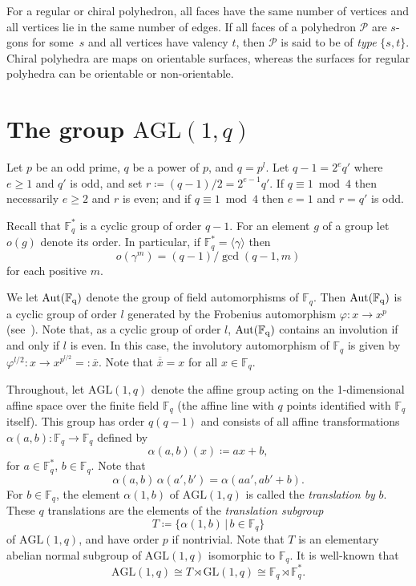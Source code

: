 \documentclass[12pt]{article}
\theoremstyle{definition}\newtheorem{definition}{Definition}[section]
\begin{document}
For a regular or chiral polyhedron, all faces have the same number of vertices and all vertices lie in the same number of edges. If all faces of a polyhedron $\mathcal{P}$ are $s$-gons for some~$s$ and all vertices have valency $t$, then $\mathcal{P}$ is said to be of {\em type\/} $\{s,t\}$. Chiral polyhedra are maps on orientable surfaces, whereas the surfaces for regular polyhedra can be orientable or non-orientable.
\smallskip

\section{The group \texorpdfstring{$\mathrm{AGL}(1,q)$}{AGL(1, q)}}
\label{groupagl}

Let $p$ be an odd prime, $q$ be a power of $p$, and $q=p^l$. Let $q-1=2^{e}q'$ where $e\geq 1$ and $q'$ is odd, and set $r\coloneqq (q-1)/2=2^{e-1}q'$. If $q\equiv 1 \bmod 4$ then necessarily $e\geq 2$ and $r$ is even; and if $q\equiv 1 \bmod 4$ then $e=1$ and $r=q'$ is odd. 

Recall that $\mathbb{F}_q^*$ is a cyclic group of order $q-1$. For an element $g$ of a group let $o(g)$ denote its order. In particular, if $\mathbb{F}_q^*=\langle\gamma\rangle$ then 
\[o(\gamma^m)=(q-1)/\gcd(q-1,m)\] 
for each positive $m$.

We let $\rm{Aut}(\mathbb{F}_q)$ denote the group of field automorphisms of $\mathbb{F}_q$. Then $\rm{Aut}(\mathbb{F}_q)$ is a cyclic group of order $l$ generated by the Frobenius automorphism $\varphi: x\rightarrow x^p$ (see~\cite{Lang1993}). Note that, as a cyclic group of order $l$, $\rm{Aut}(\mathbb{F}_q)$ contains an involution if and only if $l$ is even. In this case, the involutory automorphism of $\mathbb{F}_q$ is given by $\varphi^{l/2}: x\rightarrow x^{p^{l/2}}\!\!=:\overline{x}$. Note that $\overline{\overline{x}}=x$ for all $x\in\mathbb{F}_q$. 

Throughout, let $\mathrm{AGL}(1,q)$ denote the affine group acting on the 1-dimensional affine space over the finite field $\mathbb{F}_q$ (the affine line with $q$ points identified with $\mathbb{F}_q$ itself). This group has order $q(q-1)$ and consists of all affine transformations $\alpha(a,b): \mathbb{F}_q \rightarrow \mathbb{F}_q$ defined by
\[ \alpha(a,b)(x) \coloneqq  ax+b,\]
for $a\in\mathbb{F}_q^*$, $b\in\mathbb{F}_q$. Note that 
\[ \alpha(a,b)\, \alpha(a',b') = \alpha(aa',ab'+b).\]
For $b\in\mathbb{F}_q$, the element $\alpha(1,b)$ of $\mathrm{AGL}(1,q)$ is called the \textit{translation by} $b$. These $q$ translations are the elements of the {\em translation subgroup\/}
\[ T\coloneqq \{\alpha(1,b)\,|\,b\in \mathbb{F}_q\} \]
of $\mathrm{AGL}(1,q)$, and have order $p$ if nontrivial. Note that $T$ is an elementary abelian normal subgroup of $\mathrm{AGL}(1,q)$ isomorphic to $\mathbb{F}_q$. It is well-known that 
\[ \mathrm{AGL}(1,q) \cong T\rtimes \mathrm{GL}(1,q)\cong \mathbb{F}_q \rtimes \mathbb{F}_q^* .\]
\smallskip 
\end{document}
